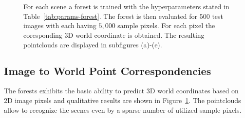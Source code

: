 \documentclass[final]{cvpr}
\begin{document}
\begin{figure}
	\begin{center}
	
	\,
	\,
	\\
	\,
	\,

	\end{center}
	\caption{For each scene a forest is trained with the hyperparameters stated in Table~\ref{tab:params-forest}. The forest 
	is then evaluated for $500$ test images with each having $5,000$ sample pixels. For each pixel the coresponding
	3D world coordinate is obtained. The resulting pointclouds are displayed in subfigures (a)-(e). }
	\label{fig:pointclouds}
\end{figure}

\subsection{Image to World Point Correspondencies} \label{subsec:eval-forest}
The forests exhibits the basic ability to predict 3D world coordinates based on 2D image pixels and 
qualitative results are shown in Figure~\ref{fig:pointclouds}. The pointclouds 
allow to recognize the scenes even by a sparse number of utilized sample pixels. 
\end{document}
